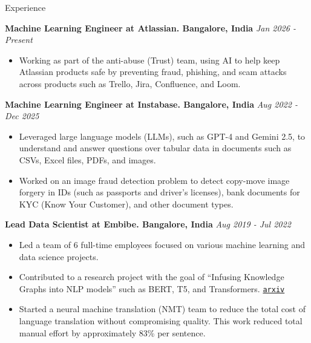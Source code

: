 \documentclass{resume}
\begin{document}
\begin{rSection}{Experience}

{\bf Machine Learning Engineer at Atlassian. Bangalore, India} \hfill {\em Jan 2026 - Present}
\begin{itemize}
\item Working as part of the anti-abuse (Trust) team, using AI to help keep Atlassian products safe by preventing fraud, phishing, and scam attacks across products such as Trello, Jira, Confluence, and Loom.
\end{itemize}

{\bf Machine Learning Engineer at Instabase. Bangalore, India} \hfill {\em Aug 2022 - Dec 2025}
\begin{itemize}
\item Leveraged large language models (LLMs), such as GPT-4 and Gemini 2.5, to understand and answer questions over tabular data in documents such as CSVs, Excel files, PDFs, and images.
\item Worked on an image fraud detection problem to detect copy-move image forgery in IDs (such as passports and driver's licenses), bank documents for KYC (Know Your Customer), and other document types.
\end{itemize}

{\bf Lead Data Scientist at Embibe. Bangalore, India} \hfill {\em Aug 2019 - Jul 2022}
\begin{itemize}
\item Led a team of 6 full-time employees focused on various machine learning and data science projects.
\item Contributed to a research project with the goal of ``Infusing Knowledge Graphs into NLP models'' such as BERT, T5, and Transformers. \href{https://arxiv.org/abs/2104.08145}{\texttt{arxiv}}
\item Started a neural machine translation (NMT) team to reduce the total cost of language translation without compromising quality. This work reduced total manual effort by approximately 83\% per sentence.
\end{itemize}



\end{rSection}
\end{document}
